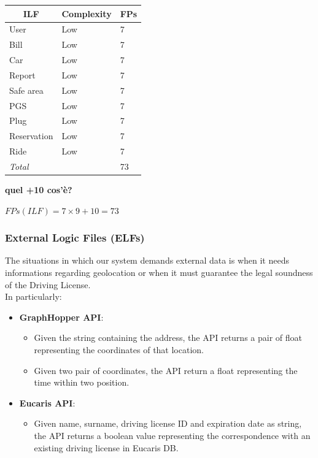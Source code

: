 \documentclass[english]{article}
\begin{document}
\begin{center}
	\begin{tabular}{ |p{8cm}|m{2cm}|p{1cm}| }
		\hline
		\multicolumn{1}{|c|}{\textbf{ILF}} & \multicolumn{1}{c|}{\textbf{Complexity}} & \multicolumn{1}{c|}{\textbf{FPs}} \\
		\hline
		User & Low & 7 \\
		\hline
		Bill & Low & 7\\
		\hline
		Car & Low & 7\\
		\hline
		Report & Low & 7\\
		\hline
		Safe area & Low & 7\\
		\hline
		PGS & Low & 7\\
		\hline
		Plug & Low & 7\\
		\hline
		Reservation & Low & 7\\
		\hline
		Ride & Low & 7\\
		\hline
		\multicolumn{2}{|l|}{\textit{Total}} & \multicolumn{1}{l|}{73} \\
		\hline
	\end{tabular}
\end{center}

\textbf{quel +10 cos'è?}

\begin{center}
$ FPs (ILF) = 7 \times 9 + 10= 73 $
\end{center}

\subsubsection{External Logic Files (ELFs)}

The situations in which our system demands external data is when it needs informations regarding geolocation or when it must guarantee the legal soundness of the Driving License.\\
In particularly:

\begin{itemize}
	\item \textbf{GraphHopper API}:
		\begin{itemize}
			\item{Given the string containing the address, the API returns a pair of float representing the coordinates of that location.}
			\item{Given two pair of coordinates, the API return a float representing the time within two position.}
		\end{itemize}
	\item \textbf{Eucaris API}:
		\begin{itemize}
			\item{Given name, surname, driving license ID and expiration date as string, the API returns a boolean value representing the correspondence with an existing driving license in Eucaris DB.}
		\end{itemize}
\end{itemize}
\end{document}
